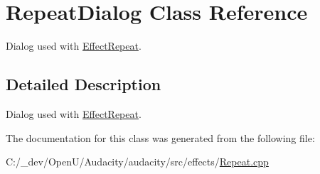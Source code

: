 \hypertarget{class_repeat_dialog}{}\section{Repeat\+Dialog Class Reference}
\label{class_repeat_dialog}


Dialog used with \hyperlink{class_effect_repeat}{Effect\+Repeat}.  




\subsection{Detailed Description}
Dialog used with \hyperlink{class_effect_repeat}{Effect\+Repeat}. 

The documentation for this class was generated from the following file\+:\begin{DoxyCompactItemize}
\item 
C\+:/\+\_\+dev/\+Open\+U/\+Audacity/audacity/src/effects/\hyperlink{_repeat_8cpp}{Repeat.\+cpp}\end{DoxyCompactItemize}
